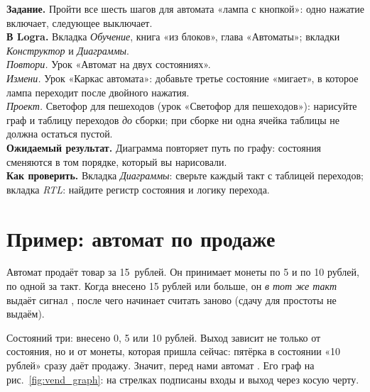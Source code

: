 \begin{diybox}
\textbf{Задание.} Пройти все шесть шагов для автомата «лампа с кнопкой»: одно
нажатие включает, следующее выключает.\\
\textbf{В Logra.} Вкладка \emph{Обучение}, книга «из блоков», глава
«Автоматы»; вкладки \emph{Конструктор} и \emph{Диаграммы}.\\
 \emph{Повтори.} Урок «Автомат на двух состояниях».\\
 \emph{Измени.} Урок «Каркас автомата»: добавьте третье состояние
«мигает», в которое лампа переходит после двойного нажатия.\\
 \emph{Проект.} Светофор для пешеходов (урок «Светофор для
пешеходов»): нарисуйте граф и таблицу переходов \emph{до} сборки; при
сборке ни одна ячейка таблицы не должна остаться пустой.\\
\textbf{Ожидаемый результат.} Диаграмма повторяет путь по графу: состояния
сменяются в том порядке, который вы нарисовали.\\
\textbf{Как проверить.} Вкладка \emph{Диаграммы}: сверьте каждый такт с
таблицей переходов; вкладка \emph{RTL}: найдите регистр состояния и логику
перехода.
\end{diybox}

\section{Пример: автомат по продаже}

Автомат продаёт товар за 15~рублей. Он принимает монеты по 5 и по 10 рублей,
по одной за такт. Когда внесено 15 рублей или больше, он \emph{в тот же
такт} выдаёт сигнал , после чего начинает считать заново (сдачу
для простоты не выдаём).

Состояний три: внесено 0, 5 или 10 рублей. Выход зависит не только от
состояния, но и от монеты, которая пришла сейчас: пятёрка в состоянии
«10 рублей» сразу даёт продажу. Значит, перед нами автомат . Его
граф на рис.~\ref{fig:vend_graph}: на стрелках подписаны входы и выход через
косую черту.

